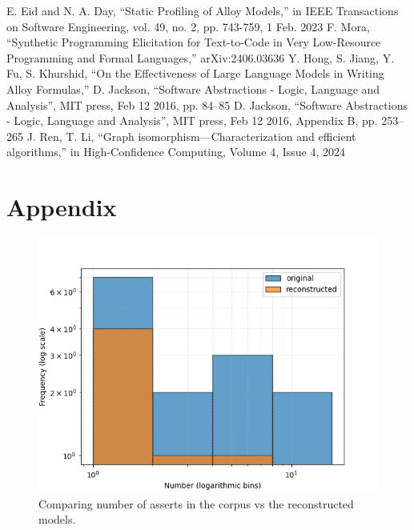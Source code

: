 \documentclass[conference]{IEEEtran}
\begin{document}
\begin{thebibliography}{00}
 E. Eid and N. A. Day, ``Static Profiling of Alloy Models,'' in IEEE Transactions on Software Engineering, vol. 49, no. 2, pp. 743-759, 1 Feb. 2023 
 F. Mora, ``Synthetic Programming Elicitation for Text-to-Code in Very Low-Resource Programming and Formal Languages,'' arXiv:2406.03636
 Y. Hong, S. Jiang, Y. Fu, S. Khurshid, ``On the Effectiveness of Large Language Models in Writing Alloy Formulas,''
 D. Jackson, ``Software Abstractions - Logic, Language and Analysis'', MIT press, Feb 12 2016, pp. 84--85
 D. Jackson, ``Software Abstractions - Logic, Language and Analysis'', MIT press, Feb 12 2016, Appendix B, pp. 253--265
 J. Ren, T. Li, ``Graph isomorphism—Characterization and efficient algorithms,'' in High-Confidence Computing, Volume 4, Issue 4, 2024
\end{thebibliography}


\section{Appendix}


\begin{figure}[htbp]
    \centerline{\includegraphics[width=\linewidth]{"./Comparing number of asserts in the corpus vs the reconstructed models.png"}}
    \caption{Comparing number of asserts in the corpus vs the reconstructed models.}
    \label{fig}
    \end{figure}
    
\end{document}
